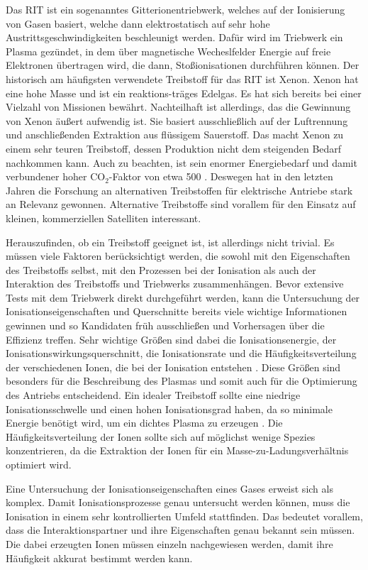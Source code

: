 Das RIT ist ein sogenanntes Gitterionentriebwerk, welches auf der Ionisierung von Gasen basiert, welche dann elektrostatisch auf sehr hohe Austrittsgeschwindigkeiten beschleunigt werden. Dafür wird im Triebwerk ein Plasma gezündet, in dem über magnetische Wecheslfelder Energie auf freie Elektronen übertragen wird, die dann, Stoßionisationen durchführen können. Der historisch am häufigsten verwendete Treibstoff für das RIT ist Xenon. Xenon hat eine hohe Masse und ist ein reaktions-träges Edelgas. Es hat sich bereits bei einer Vielzahl von Missionen bewährt. Nachteilhaft ist allerdings, das die Gewinnung von Xenon äußert aufwendig ist. Sie basiert ausschließlich auf der Luftrennung und anschließenden Extraktion aus flüssigem Sauerstoff. Das macht Xenon zu einem sehr teuren Treibstoff, dessen Produktion nicht dem steigenden Bedarf nachkommen kann. Auch zu beachten, ist sein enormer Energiebedarf und damit verbundener hoher CO$_2$-Faktor von etwa 500 \cite{CO2}. Deswegen hat in den letzten Jahren die Forschung an alternativen Treibstoffen für elektrische Antriebe stark an Relevanz gewonnen. Alternative Treibstoffe sind vorallem für den Einsatz auf kleinen, kommerziellen Satelliten interessant. 

Herauszufinden, ob ein Treibstoff geeignet ist, ist allerdings nicht trivial. Es müssen viele Faktoren berücksichtigt werden, die sowohl mit den Eigenschaften des Treibstoffs selbst, mit den Prozessen bei der Ionisation als auch der Interaktion des Treibstoffs und Triebwerks zusammenhängen. Bevor extensive Tests mit dem Triebwerk direkt durchgeführt werden, kann die Untersuchung der Ionisationseigenschaften und Querschnitte bereits viele wichtige Informationen gewinnen und so Kandidaten früh ausschließen und Vorhersagen über die Effizienz treffen. Sehr wichtige Größen sind dabei die Ionisationsenergie, der Ionisationswirkungsquerschnitt, die Ionisationsrate und die Häufigkeitsverteilung der verschiedenen Ionen, die bei der Ionisation entstehen \cite{ion}. Diese Größen sind besonders für die Beschreibung des Plasmas und somit auch für die Optimierung des Antriebs entscheidend. Ein idealer Treibstoff sollte eine niedrige Ionisationsschwelle und einen hohen Ionisationsgrad haben, da so minimale Energie benötigt wird, um ein dichtes Plasma zu erzeugen \cite{Prop}. Die Häufigkeitsverteilung der Ionen sollte sich auf möglichst wenige Spezies konzentrieren, da die Extraktion der Ionen für ein Masse-zu-Ladungsverhältnis optimiert wird.

Eine Untersuchung der Ionisationseigenschaften eines Gases erweist sich als komplex. Damit Ionisationsprozesse genau untersucht werden können, muss die Ionisation in einem sehr kontrollierten Umfeld stattfinden. Das bedeutet vorallem, dass die Interaktionspartner und ihre Eigenschaften genau bekannt sein müssen. Die dabei erzeugten Ionen müssen einzeln nachgewiesen werden, damit ihre Häufigkeit akkurat bestimmt werden kann. 

